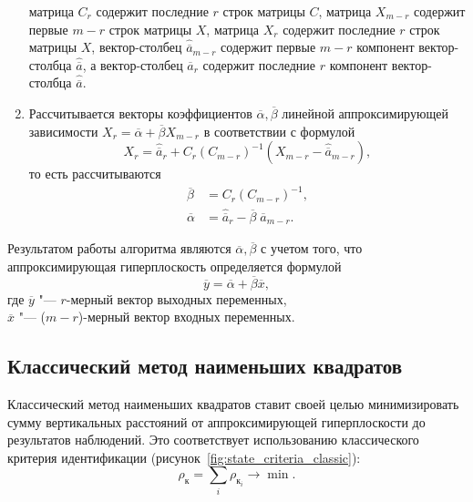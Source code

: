 \begin{enumerate}
  матрица \( C_{r} \)  содержит последние \( r \) строк матрицы \( C \),
  матрица \( X_{m-r} \) содержит первые \( m-r \) строк матрицы \( X \),
  матрица \( X_{r} \) содержит последние \( r \) строк матрицы \( X \),
  вектор-столбец \( \hat{\overline{a}}_{m-r} \) содержит первые \( m - r \) компонент
  вектор-столбца \( \hat{\overline{a}} \),
  а вектор-столбец \( \hat{\overline{a}}_{r} \) содержит последние \( r \) компонент
  вектор-столбца \( \hat{\overline{a}} \).
\item Рассчитывается векторы коэффициентов \( \overline{\alpha}, \overline{\beta} \)
  линейной аппроксимирующей зависимости
  \( X_r = \overline{\alpha} + \overline{\beta} X_{m-r}\)
  в соответствии с формулой
  \[ X_r = \hat{\overline{a}}_r + C_r (C_{m-r})^{-1} (X_{m-r} - \hat{\overline{a}}_{m-r}), \]
  то есть рассчитываются
  \begin{equation*}
    \begin{aligned}
      \overline{\beta} &= C_{r} (C_{m-r})^{-1}, \\
      \overline{\alpha} &= \hat{\overline{a}}_{r} - \overline{\beta} \; \hat{\overline{a}}_{m-r}.
    \end{aligned}
  \end{equation*}
\end{enumerate}

Результатом работы алгоритма являются \( \overline{\alpha}, \overline{\beta} \) с учетом того,
что аппроксимирующая гиперплоскость определяется формулой
\[ \overline{y} = \overline{\alpha} + \overline{\beta} \overline{x}, \]
где \( \overline{y} \) "--- \( r \)-мерный вектор выходных переменных, \\
\hspace*{7mm} \( \overline{x} \) "--- (\( m - r \))-мерный вектор входных переменных.

\vspace{2\baselineskip}
\subsection{Классический метод наименьших квадратов}\label{ssec:linear_method_classic}

Классический метод наименьших квадратов ставит своей целью минимизировать сумму
вертикальных расстояний от аппроксимирующей гиперплоскости до результатов наблюдений.
Это соответствует использованию классического критерия идентификации
(рисунок~\ref{fig:state_criteria_classic}):
\begin{equation*}
  \rho_{\text{к}} = \sum_i \rho_{\text{к}_i} \rightarrow \min.
\end{equation*}

